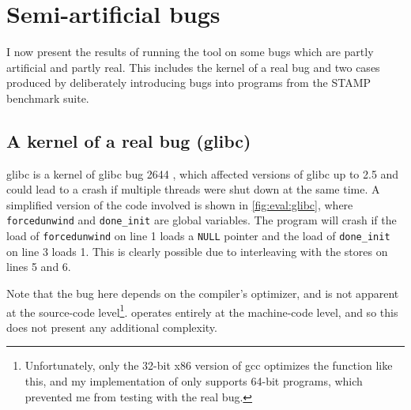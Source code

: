 \section{Semi-artificial bugs}
\label{sect:eval:semiartificial}

I now present the results of running the tool on some bugs which are
partly artificial and partly real.  This includes the kernel of a real
bug and two cases produced by deliberately introducing bugs into
programs from the STAMP benchmark suite\needCite{}.

\subsection{A kernel of a real bug (glibc)}
\label{sect:eval:glibc}


glibc is a kernel of glibc bug 2644 \cite{Cambell2006}, which
affected versions of glibc up to 2.5 and could lead to a crash if
multiple threads were shut down at the same time.  A simplified
version of the code involved is shown in \autoref{fig:eval:glibc},
where \texttt{forcedunwind} and \texttt{done\_init} are global
variables.  The program will crash if the load of
\texttt{forcedunwind} on line 1 loads a \texttt{NULL} pointer and the
load of \texttt{done\_init} on line 3 loads 1.  This is clearly
possible due to interleaving with the stores on lines 5 and 6.

Note that the bug here depends on the compiler's optimizer, and is not
apparent at the source-code level\footnote{Unfortunately, only the
  32-bit x86 version of gcc optimizes the function like this, and my
  implementation of {\technique} only supports 64-bit programs, which
  prevented me from testing with the real bug.}.  {\Technique}
operates entirely at the machine-code level, and so this does not
present any additional complexity.

